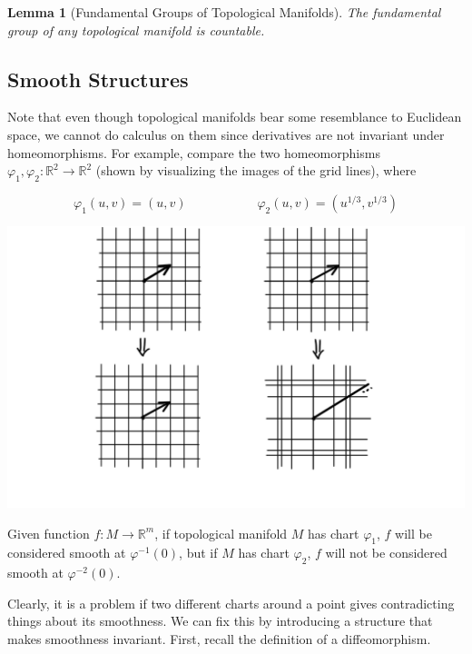 \documentclass{article}
\newtheorem{lemma}[theorem]{Lemma}
\theoremstyle{remark}
\theoremstyle{definition}
\begin{document}
    \begin{lemma}[Fundamental Groups of Topological Manifolds]
      The fundamental group of any topological manifold is countable. 
    \end{lemma}

  \subsection{Smooth Structures}

    Note that even though topological manifolds bear some resemblance to Euclidean space, we cannot do calculus on them since derivatives are not invariant under homeomorphisms. For example, compare the two homeomorphisms $\varphi_1, \varphi_2: \mathbb{R}^2 \longrightarrow \mathbb{R}^2$ (shown by visualizing the images of the grid lines), where

    \[\varphi_1 (u, v) = (u, v) \;\;\;\;\;\;\;\;\;\;\;\;\;\;\;\;\;\;\;\; \varphi_2 (u, v) = (u^{1/3}, v^{1/3})\]

    \begin{center}
      \includegraphics[scale=0.22]{img/Nonexistent_Derivative_Homeomorphism.PNG}
    \end{center}

    Given function $f: M \longrightarrow \mathbb{R}^m$, if topological manifold $M$ has chart $\varphi_1$, $f$ will be considered smooth at $\varphi^{-1}(0)$, but if $M$ has chart $\varphi_2$, $f$ will not be considered smooth at $\varphi^{-2}(0)$. 

    Clearly, it is a problem if two different charts around a point gives contradicting things about its smoothness. We can fix this by introducing a structure that makes smoothness invariant. First, recall the definition of a diffeomorphism. 
\end{document}
